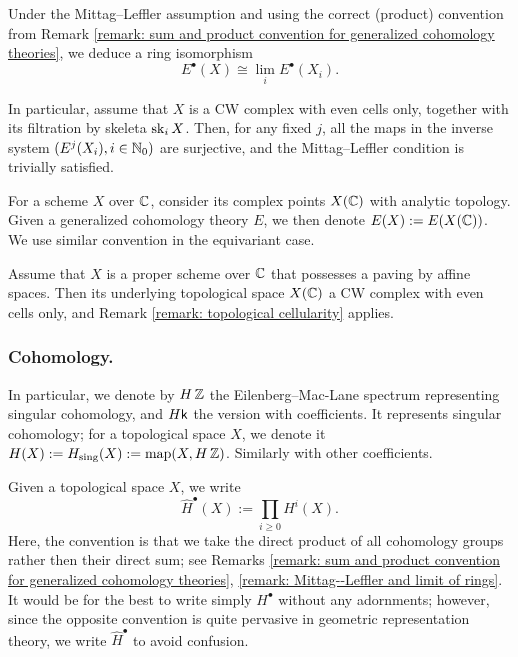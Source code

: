 \begin{remark}\label{remark: Mittag--Leffler and limit of rings}
Under the Mittag--Leffler assumption and using the correct (product) convention from Remark \ref{remark: sum and product convention for generalized cohomology theories}, we deduce a ring isomorphism
\begin{equation*}
    E^{\bullet}(X) \cong \lim_i E^{\bullet}(X_i).
\end{equation*}
\end{remark}

\begin{remark}\label{remark: topological cellularity}
In particular, assume that $X$ is a CW complex with even cells only, together with its filtration by skeleta $\operatorname{sk}_i X$. Then, for any fixed $j$, all the maps in the inverse system $(E^{j}(X_i), i \in \operatorname{\mathbb{N}}_0)$ are surjective, and the Mittag--Leffler condition is trivially satisfied.
\end{remark}

\begin{remark}
For a scheme $X$ over $\operatorname{\mathbb{C}}$, consider its complex points $X(\operatorname{\mathbb{C}})$ with analytic topology. Given a generalized cohomology theory $E$, we then denote $E(X) := E(X(\operatorname{\mathbb{C}}))$. We use similar convention in the equivariant case.

Assume that $X$ is a proper scheme over $\operatorname{\mathbb{C}}$ that possesses a paving by affine spaces. Then its underlying topological space $X(\operatorname{\mathbb{C}})$ a CW complex with even cells only, and Remark \ref{remark: topological cellularity} applies.    
\end{remark}





\subsubsection{Cohomology.}
In particular, we denote by $H\operatorname{\mathbb{Z}}$ the Eilenberg--Mac-Lane spectrum representing singular cohomology, and $H\mathsf{k}$ the version with coefficients. It represents singular cohomology; for a topological space $X$, we denote it $H(X) := H_{\mathrm{sing}}(X) := \operatorname{map}(X, H\operatorname{\mathbb{Z}})$. Similarly with other coefficients.

\begin{convention}
Given a topological space $X$, we write
\begin{equation*}
    \widehat{H}^{\bullet}(X) := \prod_{i \geq 0} H^{i}(X).
\end{equation*}
Here, the convention is that we take the direct product of all cohomology groups rather then their direct sum; see Remarks \ref{remark: sum and product convention for generalized cohomology theories}, \ref{remark: Mittag--Leffler and limit of rings}. 
%
It would be for the best to write simply $H^{\bullet}$ without any adornments; however, since the opposite convention is quite pervasive in geometric representation theory, we write $\widehat{H}^{\bullet}$ to avoid confusion.
\end{convention}



